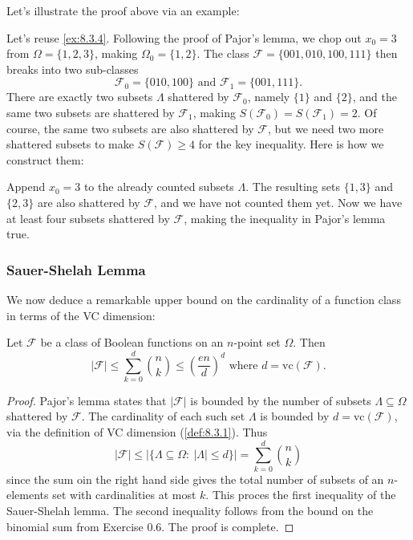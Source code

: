Let's illustrate the proof above via an example: 
\begin{example}[]
\label{ex:8.3.8}
Let's reuse \cref{ex:8.3.4}. Following the proof of Pajor's lemma, we chop out $x_0 = 3$ from $\Omega = \{1, 
2, 3\}$, making $\Omega_0 = \{1, 2\}$. The class $\mathcal{F} = \{001, 010, 100, 111\}$ then breaks into two 
sub-classes
\[ \mathcal{F}_0 = \{010, 100\} \text{ and } \mathcal{F}_1 = \{001, 111\}. \]
There are exactly two subsets $\Lambda$ shattered by $\mathcal{F}_0$, namely $\{1\}$ and $\{2\}$, and the same 
two subsets are shattered by $\mathcal{F}_1$, making $S(\mathcal{F}_0) = S(\mathcal{F}_1) = 2$. Of course, the 
same two subsets are also shattered by $\mathcal{F}$, but we need two more shattered subsets to make 
$S(\mathcal{F}) \geq 4$ for the key inequality. Here is how we construct them:

Append $x_0 = 3$ to the already counted subsets $\Lambda$. The resulting sets $\{1, 3\}$ and $\{2, 3\}$ are 
also shattered by $\mathcal{F}$, and we have not counted them yet. Now we have at least four subsets shattered 
by $\mathcal{F}$, making the inequality in Pajor's lemma true.
\end{example}


\subsubsection{Sauer-Shelah Lemma}
We now deduce a remarkable upper bound on the cardinality of a function class in terms of the VC dimension:

\begin{lemma}
\label{lem:8.3.9}
Let $\mathcal{F}$ be a class of Boolean functions on an $n$-point set $\Omega$. Then 
\[ |\mathcal{F}| \leq \sum_{k = 0}^{d} \binom{n}{k} \leq \left( \frac{en}{d} \right)^d \text{ where } 
d = \mathrm{vc}(\mathcal{F}). \]
\end{lemma}

\begin{proof}
Pajor's lemma states that $|\mathcal{F}|$ is bounded by the number of subsets $\Lambda \subseteq \Omega$ 
shattered by $\mathcal{F}$. The cardinality of each such set $\Lambda$ is bounded by $d = 
\mathrm{vc}(\mathcal{F})$, via the definition of VC dimension (\cref{def:8.3.1}). Thus 
\[ |\mathcal{F}| \leq |\{ \Lambda \subseteq \Omega: \ |\Lambda| \leq d \}| 
= \sum_{k = 0}^{d} \binom{n}{k} \]
since the sum oin the right hand side gives the total number of subsets of an $n$-elements set with 
cardinalities at most $k$. This proces the first inequality of the Sauer-Shelah lemma. The second inequality 
follows from the bound on the binomial sum from Exercise 0.6. The proof is complete.
\end{proof}

